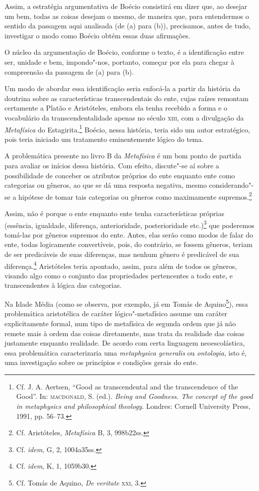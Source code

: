 Assim, a estratégia argumentativa de Boécio consistirá em dizer
que, ao desejar um bem, todas as coisas desejam o mesmo, de
maneira que, para entendermos o sentido da passagem aqui
analisada (de (a) para (b)), precisamos, antes de tudo,
investigar o modo como Boécio obtém essas duas afirmações.

O núcleo da argumentação de Boécio, conforme o texto, é a
identificação entre ser, unidade e bem, impondo"-nos, portanto,
começar por ela para chegar à compreensão da passagem de (a)
para (b).

Um modo de abordar essa identificação seria enfocá-la a partir da
história da doutrina sobre as características transcendentais do
ente, cujas raízes remontam certamente a Platão e Aristóteles,
embora ela tenha recebido a forma e o vocabulário da
transcendentalidade apenas no século \textsc{xiii}, com a divulgação da
\emph{Metafísica} do Estagirita.\footnote{ Cf. J. A. Aertsen,
“Good as transcendental and the transcendence of the Good”. In:
\textsc{macdonald}, S. (ed.). \emph{Being and Goodness. The concept of
the good in metaphysics and philosophical theology}. Londres:
Cornell University Press, 1991, pp. 56--73.} Boécio, nessa
história, teria sido um autor estratégico, pois teria iniciado
um tratamento eminentemente lógico do tema.

A problemática presente no livro B da \emph{Metafísica} é um
bom ponto de partida para avaliar os inícios dessa história. Com
efeito, discute"-se aí sobre a possibilidade de conceber os
atributos próprios do ente enquanto ente como categorias ou
gêneros, ao que se dá uma resposta negativa, mesmo
considerando"-se a hipótese de tomar tais categorias ou gêneros
como maximamente supremos.\footnote{ Cf. Aristóteles,
\emph{Metafísica} B, 3, 998b22ss.}

Assim, não é porque o ente enquanto ente tenha características
próprias (essência, igualdade, diferença, anterioridade,
posterioridade etc.)\footnote{ Cf. \emph{idem}, G, 2,
1004a35ss.} que poderemos tomá-las por gêneros supremos do ente.
Antes, elas serão como modos de falar do ente, todas logicamente
convertíveis, pois, do contrário, se fossem gêneros, teriam de
ser predicáveis de suas diferenças, mas nenhum gênero é
predicável de sua diferença.\footnote{ Cf. \emph{idem}, K, 1,
1059b30.} Aristóteles teria apontado, assim, para além de todos
os gêneros, visando algo como o conjunto das propriedades
pertencentes a todo ente, e transcendentes à lógica das
categorias.

Na Idade Média (como se observa, por exemplo, já em Tomás de
Aquino\footnote{ Cf. Tomás de Aquino, \emph{De veritate}
\textsc{xxi},
3.}), essa problemática aristotélica de caráter
lógico"-metafísico assume um caráter explicitamente formal, num
tipo de metafísica de segunda ordem que já não remete mais à
ordem das coisas diretamente, mas trata da realidade das coisas
justamente enquanto realidade. De acordo com certa linguagem
neoescolástica, essa problemática caracterizaria uma
\emph{metaphysica generalis} ou \emph{ontologia}, isto é,
uma investigação sobre os princípios e condições gerais do ente.

